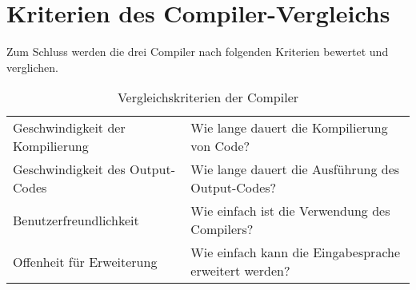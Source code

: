 \section{Kriterien des Compiler-Vergleichs}
Zum Schluss werden die drei Compiler nach folgenden Kriterien bewertet und verglichen.

\begin{table}[H]
    \centering
    \caption{Vergleichskriterien der Compiler}
    \vspace{3mm} %

    \begin{tabular}{l|l}
    Geschwindigkeit der Kompilierung    & Wie lange dauert die Kompilierung von Code?                       \\
    Geschwindigkeit des Output-Codes    & Wie lange dauert die Ausführung des Output-Codes?                 \\
    Benutzerfreundlichkeit              & Wie einfach ist die Verwendung des Compilers?                     \\
    Offenheit für Erweiterung           & Wie einfach kann die Eingabesprache erweitert werden?                                 
    \end{tabular}
\end{table}

